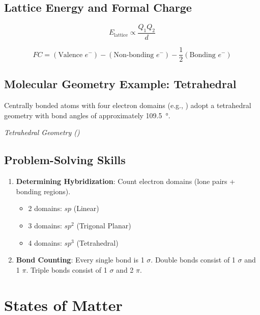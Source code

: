 \documentclass[11pt]{article}
\begin{document}
\subsection{Lattice Energy and Formal Charge}
\begin{tcolorbox}[memorize, title=Coulomb's Law *]
    \[ E_{\text{lattice}} \propto \frac{Q_1 Q_2}{d} \]
\end{tcolorbox}

\begin{tcolorbox}[memorize, title=Formal Charge *]
    \[ FC = (\text{Valence } e^-) - (\text{Non-bonding } e^-) - \frac{1}{2}(\text{Bonding } e^-) \]
\end{tcolorbox}

\subsection{Molecular Geometry Example: Tetrahedral}
Centrally bonded atoms with four electron domains (e.g., ) adopt a tetrahedral geometry with bond angles of approximately \SI{109.5}{\degree}.

\begin{center}
    \quad
    \textit{Tetrahedral Geometry ()}
\end{center}

\subsection{Problem-Solving Skills}
\begin{enumerate}
    \item \textbf{Determining Hybridization}: Count electron domains (lone pairs + bonding regions).
        \begin{itemize}
            \item 2 domains: $sp$ (Linear)
            \item 3 domains: $sp^2$ (Trigonal Planar)
            \item 4 domains: $sp^3$ (Tetrahedral)
        \end{itemize}
    \item \textbf{Bond Counting}: Every single bond is 1 $\sigma$. Double bonds consist of 1 $\sigma$ and 1 $\pi$. Triple bonds consist of 1 $\sigma$ and 2 $\pi$.
\end{enumerate}

\newpage

\section{States of Matter}
\end{document}
